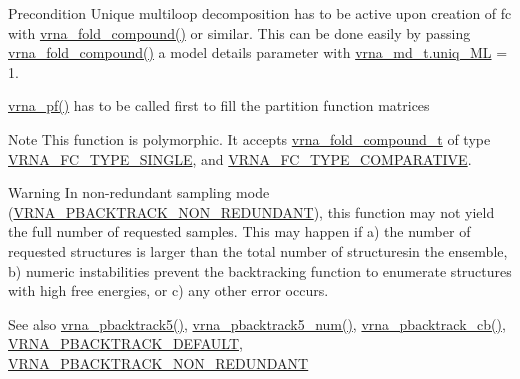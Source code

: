\begin{DoxyPrecond}{Precondition}
Unique multiloop decomposition has to be active upon creation of {\ttfamily fc} with \mbox{\hyperlink{group__fold__compound_ga6601d994ba32b11511b36f68b08403be}{vrna\+\_\+fold\+\_\+compound()}} or similar. This can be done easily by passing \mbox{\hyperlink{group__fold__compound_ga6601d994ba32b11511b36f68b08403be}{vrna\+\_\+fold\+\_\+compound()}} a model details parameter with \mbox{\hyperlink{group__model__details_ade065b814a4e2e72ead93ab502613ed2}{vrna\+\_\+md\+\_\+t.\+uniq\+\_\+\+ML}} = 1. 

\mbox{\hyperlink{group__part__func__global_ga29e256d688ad221b78d37f427e0e99bc}{vrna\+\_\+pf()}} has to be called first to fill the partition function matrices
\end{DoxyPrecond}
\begin{DoxyNote}{Note}
This function is polymorphic. It accepts \mbox{\hyperlink{group__fold__compound_ga1b0cef17fd40466cef5968eaeeff6166}{vrna\+\_\+fold\+\_\+compound\+\_\+t}} of type \mbox{\hyperlink{group__fold__compound_gga01a4ff86fa71deaaa5d1abbd95a1447da7e264dd3cf2dc9b6448caabcb7763cd6}{V\+R\+N\+A\+\_\+\+F\+C\+\_\+\+T\+Y\+P\+E\+\_\+\+S\+I\+N\+G\+LE}}, and \mbox{\hyperlink{group__fold__compound_gga01a4ff86fa71deaaa5d1abbd95a1447dab821ce46ea3cf665be97df22a76f5023}{V\+R\+N\+A\+\_\+\+F\+C\+\_\+\+T\+Y\+P\+E\+\_\+\+C\+O\+M\+P\+A\+R\+A\+T\+I\+VE}}.
\end{DoxyNote}
\begin{DoxyWarning}{Warning}
In non-\/redundant sampling mode (\mbox{\hyperlink{group__subopt__stochbt_ga9d580ce645aa0c38b69afdf56c332200}{V\+R\+N\+A\+\_\+\+P\+B\+A\+C\+K\+T\+R\+A\+C\+K\+\_\+\+N\+O\+N\+\_\+\+R\+E\+D\+U\+N\+D\+A\+NT}}), this function may not yield the full number of requested samples. This may happen if a) the number of requested structures is larger than the total number of structuresin the ensemble, b) numeric instabilities prevent the backtracking function to enumerate structures with high free energies, or c) any other error occurs.
\end{DoxyWarning}
\begin{DoxySeeAlso}{See also}
\mbox{\hyperlink{group__subopt__stochbt_ga72ebbe45bcbce147a12f27f62b38db78}{vrna\+\_\+pbacktrack5()}}, \mbox{\hyperlink{group__subopt__stochbt_ga30c3ddff868c44eecfdb07d99a2422ba}{vrna\+\_\+pbacktrack5\+\_\+num()}}, \mbox{\hyperlink{group__subopt__stochbt_ga843fa953a15337b15cc68401adad84d7}{vrna\+\_\+pbacktrack\+\_\+cb()}}, \mbox{\hyperlink{group__subopt__stochbt_ga760aa2fb2d5e3d7521a11454a21e9b9f}{V\+R\+N\+A\+\_\+\+P\+B\+A\+C\+K\+T\+R\+A\+C\+K\+\_\+\+D\+E\+F\+A\+U\+LT}}, \mbox{\hyperlink{group__subopt__stochbt_ga9d580ce645aa0c38b69afdf56c332200}{V\+R\+N\+A\+\_\+\+P\+B\+A\+C\+K\+T\+R\+A\+C\+K\+\_\+\+N\+O\+N\+\_\+\+R\+E\+D\+U\+N\+D\+A\+NT}}
\end{DoxySeeAlso}

